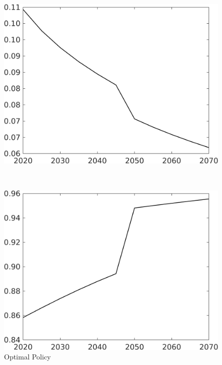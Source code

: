 \begin{figure}[h!!]
	\centering
	\caption{Optimal Policy }\label{fig:optPol}
	\begin{minipage}[]{0.4\textwidth}
		\includegraphics[width=1\textwidth]{../../codding_model/own_basedOnFried/optimalPol_190722_tidiedUp/figures/all_10Aout22/Single_OPT_T_NoTaus_taul_regime3_spillover0_noskill0_sep1_xgrowth0_extern0_etaa0.79.png}
	\end{minipage}
	\begin{minipage}[]{0.1\textwidth}
		\
	\end{minipage}
	\begin{minipage}[]{0.4\textwidth}
		\includegraphics[width=1\textwidth]{../../codding_model/own_basedOnFried/optimalPol_190722_tidiedUp/figures/all_10Aout22/Single_OPT_T_NoTaus_tauf_regime3_spillover0_noskill0_sep1_xgrowth0_extern0_etaa0.79.png}
	\end{minipage}


\end{figure}
